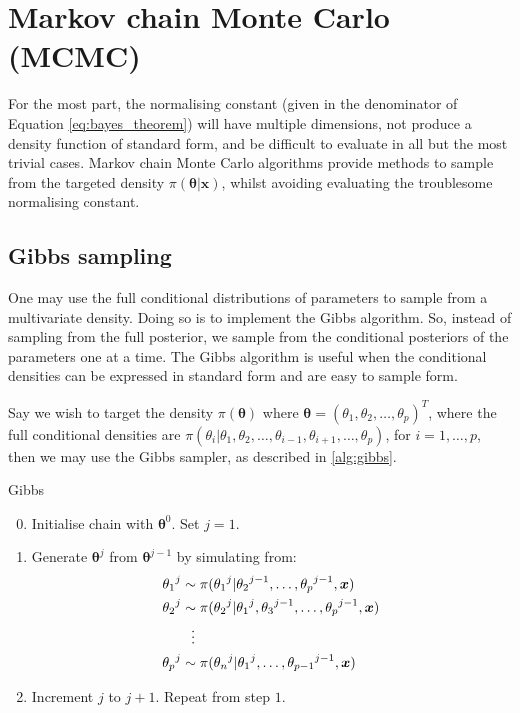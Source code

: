 \section{Markov chain Monte Carlo (MCMC)}
\label{sec:mcmc}
For the most part, the normalising constant (given in the denominator of Equation \eqref{eq:bayes_theorem}) will have multiple dimensions, not produce a density function of standard form, and be difficult to evaluate in all but the most trivial cases. Markov chain Monte Carlo algorithms provide methods to sample from the targeted density $\pi(\bm{\theta} | \bm{x})$, whilst avoiding evaluating the troublesome normalising constant.

\subsection{Gibbs sampling}
\label{ssec:gibbs_sampling}
One may use the full conditional distributions of parameters to sample from a multivariate density. Doing so is to implement the Gibbs algorithm. So, instead of sampling from the full posterior, we sample from the conditional posteriors of the parameters one at a time. The Gibbs algorithm is useful when the conditional densities can be expressed in standard form and are easy to sample form.

Say we wish to target the density $\pi(\bm{\theta})$ where $\bm{\theta} = (\theta_1, \theta_2, \dots, \theta_p)^T$, where the full conditional densities are $\pi(\theta_i | \theta_1, \theta_2, \dots, \theta_{i-1}, \theta_{i+1}, \dots, \theta_p)$, for $i=1,\dots,p$, then we may use the Gibbs sampler, as described in \cref{alg:gibbs}.

\begin{algorithm}
	\caption{Gibbs}
	\label{alg:gibbs}
	\begin{enumerate}
	    \setcounter{enumi}{-1}
	    \item Initialise chain with $\bm{\theta}^{0}$. Set $j=1$.
	    \item Generate $\bm{\theta}^{j}$ from $\bm{\theta}^{j-1}$ by simulating from:
	    \begin{align*}
	            {\theta_1}^{j} &\sim \pi({\theta_1}^{j} | {\theta_2}^{j-1},\dots,{\theta_p}^{j-1},\bm{x})\\
	            {\theta_2}^{j} &\sim \pi({\theta_2}^{j} | {\theta_1}^{j}, {\theta_3}^{j-1}, \dots, {\theta_p}^{j-1},\bm{x})\\
	            &\hspace{0.25cm}\vdots \\
	            {\theta_p}^{j} &\sim \pi({\theta_n}^{j} | {\theta_1}^{j}, \dots, {\theta_{p-1}}^{j-1},\bm{x})
	    \end{align*}
	    \item Increment $j$ to $j+1$. Repeat from step $1$.
	\end{enumerate}
\end{algorithm}

